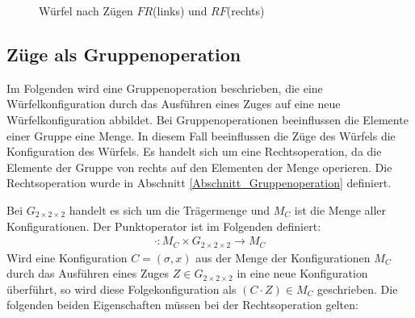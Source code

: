\documentclass[12pt,a4paper, usenames, dvipsnames]{article}
\theoremstyle{mystyle}
\theoremstyle{definition}
\newcommand{\Gtwo}{\ensuremath{G_{2\times 2\times 2}}}
\begin{document}
\begin{figure}[H]
\caption[Würfel nach Zügen $FR$ (links) und $RF$ (rechts)]{Würfel nach Zügen $FR$(links) und $RF$(rechts)}
\label{Abbildung_WürfelNachFRundRF}
\end{figure}

%
%
%
%
%
%
%
%
%
%
%
%
%
%
%
%
%
%
%
%
\subsection{Züge als Gruppenoperation}

Im Folgenden wird eine Gruppenoperation beschrieben, die eine Würfelkonfiguration durch das Ausführen eines Zuges auf eine neue Würfelkonfiguration abbildet. Bei Gruppenoperationen beeinflussen die Elemente einer Gruppe eine Menge. In diesem Fall beeinflussen die Züge des Würfels die Konfiguration des Würfels. Es handelt sich um eine Rechtsoperation, da die Elemente der Gruppe von rechts auf den Elementen der Menge operieren. Die Rechtsoperation wurde in Abschnitt \ref{Abschnitt_Gruppenoperation} definiert.

Bei $\Gtwo$ handelt es sich um die Trägermenge und $M_C$ ist die Menge aller Konfigurationen. Der Punktoperator ist im Folgenden definiert:
\begin{align*}
\cdot: M_C \times \Gtwo \rightarrow M_C
\end{align*} 
Wird eine Konfiguration $C=(\sigma, x)$ aus der Menge der Konfigurationen $M_C$ durch das Ausführen eines Zuges $Z \in \Gtwo$ in eine neue Konfiguration überführt, so wird diese Folgekonfiguration als $(C \cdot Z) \in M_C$ geschrieben.
Die folgenden beiden Eigenschaften müssen bei der Rechtsoperation gelten:
\end{document}
